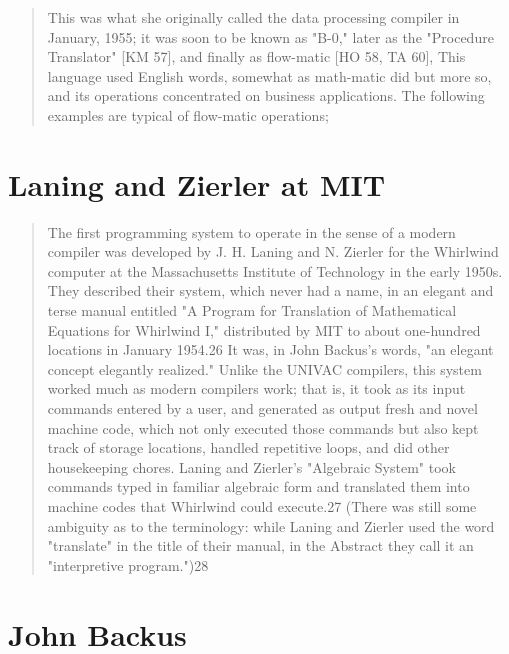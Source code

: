 \begin{quotation}
This was what she originally called the data processing compiler in January, 
1955; it was soon to be known as "B-0," later as the "Procedure Translator" [KM 
57], and finally as flow-matic [HO 58, TA 60], This language used English 
words, somewhat as math-matic did but more so, and its operations concentrated 
on business applications. The following examples are typical of flow-matic 
operations;
\cite{history_of_computing_in_the_twentieth_century_1980}
\end{quotation}

\section{Laning and Zierler at MIT}

\begin{quotation}
The first programming system to operate in the sense of a modern compiler was 
developed by J. H. Laning and N. Zierler for the Whirlwind computer at the 
Massachusetts Institute of Technology in the early 1950s. They described their 
system, which never had a name, in an elegant and terse manual entitled "A 
Program for Translation of Mathematical Equations for Whirlwind I," distributed 
by MIT to about one-hundred locations in January 1954.26 It was, in John 
Backus's words, "an elegant concept elegantly realized." Unlike the UNIVAC 
compilers, this system worked much as modern compilers work; that is, it took 
as its input commands entered by a user, and generated as output fresh and 
novel machine code, which not only executed those commands but also kept track 
of storage locations, handled repetitive loops, and did other housekeeping 
chores. Laning and Zierler's "Algebraic System" took commands typed in familiar 
algebraic form and translated them into machine codes that Whirlwind could 
execute.27 (There was still some ambiguity as to the terminology: while Laning 
and Zierler used the word "translate" in the title of their manual, in the 
Abstract they call it an "interpretive program.")28
\cite{new-history-of-modern-computing}
\end{quotation}

\section{John Backus}


